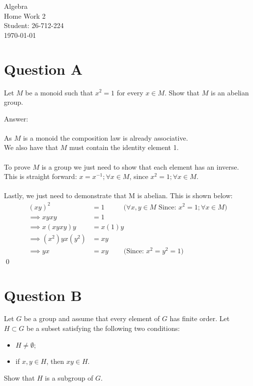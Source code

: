\documentclass[12pt,a4paper]{article}
\begin{document}
\begin{titlepage}
\centering
\vspace*{\fill}
{\Huge Algebra} \\[0.5cm]
{\Huge Home Work 2}\\[1.5cm]
{\Large Student: 26-712-224}\\[0.5cm]
{\Large \today}

\vspace{2cm}

\vspace*{\fill}
\end{titlepage}

\newpage
\section*{Question A}
Let $M$ be a monoid such that $x^2=1$ for every $x\in M$.
Show that $M$ is an abelian group.


\vspace{1cm}
\noindent
Answer:\\
\\
As $M$ is a monoid the composition law is already associative.\\
We also have that $M$ must contain the identity element 1.\\
\\
To prove $M$ is a group we just need to show that each element has an inverse.\\
This is straight forward: $x=x^{-1}; \forall x \in M$, since $x^2=1; \forall x \in M$.\\
\\
Lastly, we just need to demonstrate that M is abelian.  This is shown below:
\begin{align*}
    (x y)^2 &= 1 \;\;\;\;\;\;\;\;\;\; \text{($\forall x,y \in M$ Since: $x^2=1; \forall x \in M$)}\\
    \implies xyxy &= 1 \\
    \implies x(xyxy)y &= x(1)y \\
    \implies (x^2)yx(y^2) &= xy \\
    \implies yx &= xy \;\;\;\;\;\;\;\; \text{(Since: $x^2=y^2=1$)}
\end{align*}
\qed
\newpage
\section*{Question B}
Let $G$ be a group and assume that every element of $G$ has finite order.
Let $H\subset G$ be a subset satisfying the following two conditions:
\begin{itemize}
\item $H\neq\emptyset$;
\item if $x,y\in H$, then $xy\in H$.
\end{itemize}
Show that $H$ is a subgroup of $G$.
\end{document}
